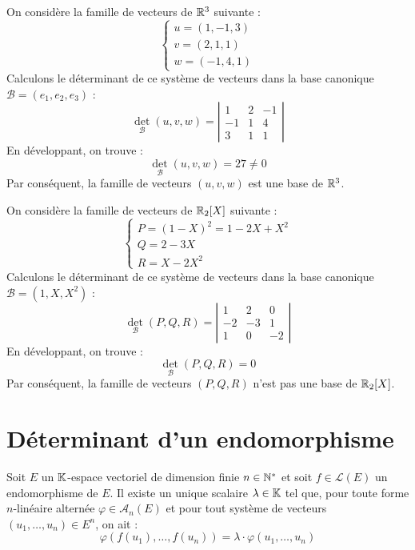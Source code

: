 \documentclass[12pt, a4paper]{report}
\begin{document}
\begin{example}[Dans $\R^3$]
    On considère la famille de vecteurs de $\R^3$ suivante :
    $$\begin{cases}
        u = (1,-1,3)\\
        v = (2,1,1) \\
        w = (-1,4,1)
    \end{cases}$$
    Calculons le déterminant de ce système de vecteurs dans la base canonique $\mathcal{B} = (e_1, e_2, e_3)$ :
    $$\det_{\mathcal{B}}(u,v,w) = \left|\begin{matrix} 1 & 2 & -1 \\ -1 & 1 & 4 \\ 3 & 1 & 1 \end{matrix}\right|$$
    En développant, on trouve :
    $$\det_{\mathcal{B}}(u,v,w) = 27 \ne 0$$
    Par conséquent, la famille de vecteurs $(u,v,w)$ est une base de $\R^3$.
\end{example}

\begin{example}
    On considère la famille de vecteurs de $\mathbb{R}_2[X]$ suivante :
    $$\begin{cases}
        P = (1-X)^2 = 1 - 2X + X^2 \\
        Q = 2-3X \\
        R = X - 2X^2
    \end{cases}$$
    Calculons le déterminant de ce système de vecteurs dans la base canonique $\mathcal{B} = (1, X, X^2)$ :
    $$\det_{\mathcal{B}}(P,Q,R) = \left|\begin{matrix} 1 & 2 & 0 \\ -2 & -3 & 1 \\ 1 & 0 & -2 \end{matrix}\right|$$
    En développant, on trouve :
    $$\det_{\mathcal{B}}(P,Q,R) = 0$$
    Par conséquent, la famille de vecteurs $(P,Q,R)$ n'est pas une base de $\mathbb{R}_2[X]$.
\end{example}

\chapter{Déterminant d'un endomorphisme}

\begin{property}
    Soit $E$ un $\mathbb{K}$-espace vectoriel de dimension finie $n \in \mathbb{N}^*$ et soit $f \in \mathcal{L}(E)$ un endomorphisme de $E$.
    Il existe un unique scalaire $\lambda \in \mathbb{K}$ tel que, pour toute forme $n$-linéaire alternée $\varphi \in \mathscr{A}_n(E)$ et pour tout système de vecteurs $(u_1, \dots, u_n) \in E^n$, on ait :
    $$\varphi(f(u_1), \dots, f(u_n)) = \lambda \cdot \varphi(u_1, \dots, u_n)$$
\end{property}
\end{document}
